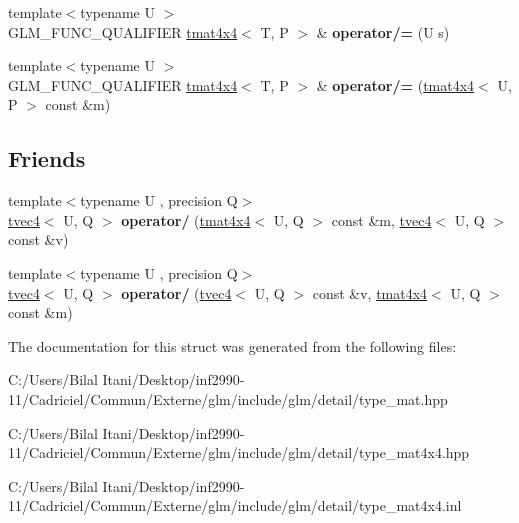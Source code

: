 \begin{DoxyCompactItemize}
\item 
{\footnotesize template$<$typename U $>$ }\\G\+L\+M\+\_\+\+F\+U\+N\+C\+\_\+\+Q\+U\+A\+L\+I\+F\+I\+ER \hyperlink{structglm_1_1detail_1_1tmat4x4}{tmat4x4}$<$ T, P $>$ \& {\bfseries operator/=} (U s)\hypertarget{structglm_1_1detail_1_1tmat4x4_a35520d796cd223a312d44020b3031f75}{}\label{structglm_1_1detail_1_1tmat4x4_a35520d796cd223a312d44020b3031f75}

\item 
{\footnotesize template$<$typename U $>$ }\\G\+L\+M\+\_\+\+F\+U\+N\+C\+\_\+\+Q\+U\+A\+L\+I\+F\+I\+ER \hyperlink{structglm_1_1detail_1_1tmat4x4}{tmat4x4}$<$ T, P $>$ \& {\bfseries operator/=} (\hyperlink{structglm_1_1detail_1_1tmat4x4}{tmat4x4}$<$ U, P $>$ const \&m)\hypertarget{structglm_1_1detail_1_1tmat4x4_ac5a16fad4c2fb2aac28c584fbcc7ee74}{}\label{structglm_1_1detail_1_1tmat4x4_ac5a16fad4c2fb2aac28c584fbcc7ee74}

\end{DoxyCompactItemize}
\subsection*{Friends}
\begin{DoxyCompactItemize}
\item 
{\footnotesize template$<$typename U , precision Q$>$ }\\\hyperlink{structglm_1_1detail_1_1tvec4}{tvec4}$<$ U, Q $>$ {\bfseries operator/} (\hyperlink{structglm_1_1detail_1_1tmat4x4}{tmat4x4}$<$ U, Q $>$ const \&m, \hyperlink{structglm_1_1detail_1_1tvec4}{tvec4}$<$ U, Q $>$ const \&v)\hypertarget{structglm_1_1detail_1_1tmat4x4_a4d1472f6e50839c280a3a7f32396b3f1}{}\label{structglm_1_1detail_1_1tmat4x4_a4d1472f6e50839c280a3a7f32396b3f1}

\item 
{\footnotesize template$<$typename U , precision Q$>$ }\\\hyperlink{structglm_1_1detail_1_1tvec4}{tvec4}$<$ U, Q $>$ {\bfseries operator/} (\hyperlink{structglm_1_1detail_1_1tvec4}{tvec4}$<$ U, Q $>$ const \&v, \hyperlink{structglm_1_1detail_1_1tmat4x4}{tmat4x4}$<$ U, Q $>$ const \&m)\hypertarget{structglm_1_1detail_1_1tmat4x4_a786a67d54520cab5d9ecd91530012ac2}{}\label{structglm_1_1detail_1_1tmat4x4_a786a67d54520cab5d9ecd91530012ac2}

\end{DoxyCompactItemize}


The documentation for this struct was generated from the following files\+:\begin{DoxyCompactItemize}
\item 
C\+:/\+Users/\+Bilal Itani/\+Desktop/inf2990-\/11/\+Cadriciel/\+Commun/\+Externe/glm/include/glm/detail/type\+\_\+mat.\+hpp\item 
C\+:/\+Users/\+Bilal Itani/\+Desktop/inf2990-\/11/\+Cadriciel/\+Commun/\+Externe/glm/include/glm/detail/type\+\_\+mat4x4.\+hpp\item 
C\+:/\+Users/\+Bilal Itani/\+Desktop/inf2990-\/11/\+Cadriciel/\+Commun/\+Externe/glm/include/glm/detail/type\+\_\+mat4x4.\+inl\end{DoxyCompactItemize}
